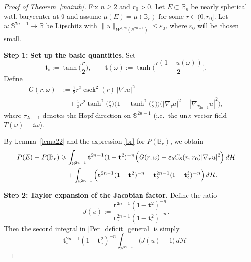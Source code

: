 \documentclass[10pt,a4paper]{amsart}
\newcommand{\csch}{\operatorname{csch}}
\def\ge{\geqslant}
\begin{document}
\begin{proof}[Proof of Theorem~\ref{mainth}]
Fix $n\ge 2$ and $r_0>0$. Let $E\subset\mathbb B_n$ be nearly spherical with barycenter at $0$
and assume $\mu(E)=\mu(\mathbb B_r)$ for some $r\in(0,r_0]$.
Let $u:\mathbb S^{2n-1}\to\mathbb R$ be Lipschitz with
$\|u\|_{W^{1,\infty}(\mathbb S^{2n-1})}\le \varepsilon_0$, where $\varepsilon_0$ will be chosen small.

\medskip

\noindent\textbf{Step 1: Set up the basic quantities.}
Set
\[
\mathbf t_\circ := \tanh\Big(\frac r2\Big),
\qquad
\mathbf t(\omega) := \tanh\Big(\frac{r(1+u(\omega))}{2}\Big).
\]
Define
\begin{equation}\label{G_general}
\begin{split}
G(r,\omega)
&:=\frac12 r^2\csch^2(r)\,|\nabla_\tau u|^2\\
&\quad+\frac18 r^2\tanh^2\!\Big(\frac r2\Big)\Big(1-\tanh^2\!\Big(\frac r2\Big)\Big)
\Big(|\nabla_\tau u|^2-|\nabla_{\tau_{2n-1}}u|^2\Big),
\end{split}
\end{equation}
where $\tau_{2n-1}$ denotes the Hopf direction on $\mathbb S^{2n-1}$ (i.e.\ the unit vector field
$T(\omega)= i\omega$).

By Lemma~\ref{lema22} and the expression \eqref{br} for $P(\mathbb B_r)$, we obtain
\begin{align}
P(E)-P(\mathbb B_r)
&\ge
\int_{\mathbb S^{2n-1}}\mathbf t^{2n-1}(1-\mathbf t^2)^{-n}
\Big(G(r,\omega)-\varepsilon_0 C_8(n,r_0)|\nabla_\tau u|^2\Big)\,d\mathcal H
\notag\\
&\quad+
\int_{\mathbb S^{2n-1}}
\Big(\mathbf t^{2n-1}(1-\mathbf t^2)^{-n}-\mathbf t_\circ^{2n-1}(1-\mathbf t_\circ^2)^{-n}\Big)\,d\mathcal H.
\label{Per_deficit_general}
\end{align}

\medskip

\noindent\textbf{Step 2: Taylor expansion of the Jacobian factor.}
Define the ratio
\[
J(u):=\frac{\mathbf t^{2n-1}(1-\mathbf t^2)^{-n}}{\mathbf t_\circ^{2n-1}(1-\mathbf t_\circ^2)^{-n}}.
\]
Then the second integral in \eqref{Per_deficit_general} is simply
\[
\mathbf t_\circ^{2n-1}(1-\mathbf t_\circ^2)^{-n}\int_{\mathbb S^{2n-1}}\big(J(u)-1\big)\,d\mathcal H.
\]

\smallskip


\end{proof}
\end{document}
